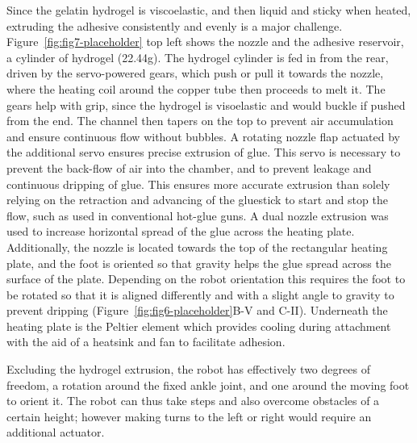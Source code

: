 Since the gelatin hydrogel is viscoelastic, and then liquid and sticky when heated, extruding the adhesive consistently and evenly is a major challenge. Figure~\ref{fig:fig7-placeholder} top left shows the nozzle and the adhesive reservoir, a cylinder of hydrogel (22.44g). The hydrogel cylinder is fed in from the rear, driven by the servo-powered gears, which push or pull it towards the nozzle, where the heating coil around the copper tube then proceeds to melt it. The gears help with grip, since the hydrogel is visoelastic and would buckle if pushed from the end. The channel then tapers on the top to prevent air accumulation and ensure continuous flow without bubbles. A rotating nozzle flap actuated by the additional servo ensures precise extrusion of glue. This servo is necessary to prevent the back-flow of air into the chamber, and to prevent leakage and continuous dripping of glue. This ensures more accurate extrusion than solely relying on the retraction and advancing of the gluestick to start and stop the flow, such as used in conventional hot-glue guns. A dual nozzle extrusion was used to increase horizontal spread of the glue across the heating plate. Additionally, the nozzle is located towards the top of the rectangular heating plate, and the foot is oriented so that gravity helps the glue spread across the surface of the plate. Depending on the robot orientation this requires the foot to be rotated so that it is aligned differently and with a slight angle to gravity to prevent dripping (Figure~\ref{fig:fig6-placeholder}B-V and C-II). Underneath the heating plate is the Peltier element which provides cooling during attachment with the aid of a heatsink and fan to facilitate adhesion.


Excluding the hydrogel extrusion, the robot has effectively two degrees of freedom, a rotation around the fixed ankle joint, and one around the moving foot to orient it. The robot can thus take steps and also overcome obstacles of a certain height; however making turns to the left or right would require an additional actuator. 

